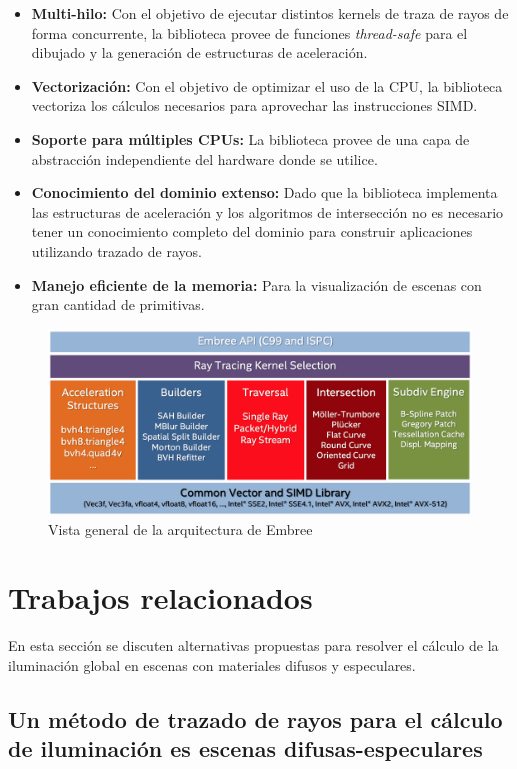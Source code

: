\begin{itemize}
	\item \textbf{Multi-hilo:} Con el objetivo de ejecutar distintos kernels de traza de rayos de forma concurrente, la biblioteca provee de funciones \textit{thread-safe} para el dibujado y la generación de estructuras de aceleración.
	\item \textbf{Vectorización:} Con el objetivo de optimizar el uso de la CPU, la biblioteca vectoriza los cálculos necesarios para aprovechar las instrucciones SIMD.
	\item \textbf{Soporte para múltiples CPUs:} La biblioteca provee de una capa de abstracción independiente del hardware donde se utilice.
	\item \textbf{Conocimiento del dominio extenso:} Dado que la biblioteca implementa las estructuras de aceleración y los algoritmos de intersección no es necesario tener un conocimiento completo del dominio para construir aplicaciones utilizando trazado de rayos.
	\item \textbf{Manejo eficiente de la memoria:} Para la visualización de escenas con gran cantidad de primitivas.
\end{itemize}

\vspace{5mm}
\begin{figure}[H]
	\centering
	\includegraphics[width=.8\linewidth]{assets/embree}
	\caption{Vista general de la arquitectura de Embree}
	\label{img:embree}
\end{figure}

\section{Trabajos relacionados}

En esta sección se discuten alternativas propuestas para resolver el cálculo de la iluminación global en escenas con materiales difusos y especulares.

\subsection{Un método de trazado de rayos para el cálculo de iluminación es escenas difusas-especulares}

